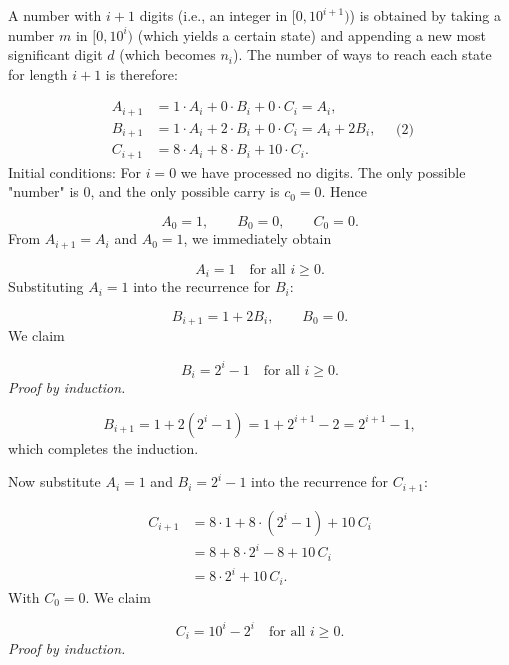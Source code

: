 A number with \(i+1\) digits (i.e., an integer in \([0,10^{i+1})\)) is obtained by taking a number \(m\) in \([0,10^i)\) (which yields a certain state) and appending a new most significant digit \(d\) (which becomes \(n_i\)). The number of ways to reach each state for length \(i+1\) is therefore:\par
\[
\begin{aligned}
A_{i+1} &= 1\cdot A_i + 0\cdot B_i + 0\cdot C_i = A_i, \\[4pt]
B_{i+1} &= 1\cdot A_i + 2\cdot B_i + 0\cdot C_i = A_i + 2B_i, \\[4pt]
C_{i+1} &= 8\cdot A_i + 8\cdot B_i + 10\cdot C_i.
\end{aligned}
\quad\text{(2)}
\]
Initial conditions: For \(i = 0\) we have processed no digits. The only possible "number" is \(0\), and the only possible carry is \(c_0 = 0\). Hence\par
\[
A_0 = 1,\qquad B_0 = 0,\qquad C_0 = 0.
\]
From \(A_{i+1} = A_i\) and \(A_0 = 1\), we immediately obtain\par
\[
\boxed{A_i = 1 \quad\text{for all } i\ge 0}.
\]
Substituting \(A_i = 1\) into the recurrence for \(B_i\):\par
\[
B_{i+1} = 1 + 2B_i,\qquad B_0 = 0.
\]
We claim\par
\[
\boxed{B_i = 2^i - 1 \quad\text{for all } i\ge 0}.
\]
\emph{Proof by induction.}\par
{}
\[
B_{i+1} = 1 + 2(2^i - 1) = 1 + 2^{i+1} - 2 = 2^{i+1} - 1,
\]
which completes the induction.\par
{}
Now substitute \(A_i = 1\) and \(B_i = 2^i - 1\) into the recurrence for \(C_{i+1}\):\par
\[
\begin{aligned}
C_{i+1} &= 8\cdot 1 + 8\cdot (2^i - 1) + 10\,C_i \\
&= 8 + 8\cdot 2^i - 8 + 10\,C_i \\
&= 8\cdot 2^i + 10\,C_i.
\end{aligned}
\]
With \(C_0 = 0\). We claim\par
\[
\boxed{C_i = 10^i - 2^i \quad\text{for all } i\ge 0}.
\]
\emph{Proof by induction.}\par
{}
